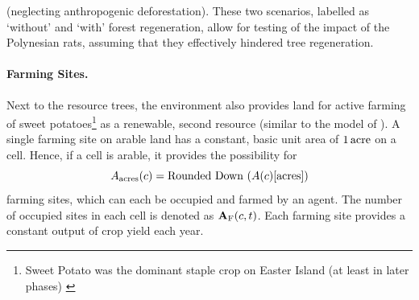 (neglecting anthropogenic deforestation).
These two scenarios, labelled as `without' and `with' forest regeneration, allow for testing of the impact of the Polynesian rats, assuming that they effectively hindered tree regeneration.

\paragraph{Farming Sites.}
Next to the resource trees, the environment also provides land for active farming of sweet potatoes\footnote{Sweet Potato was the dominant staple crop on Easter Island (at least in later phases) \citep{Louwagie2006}} as a renewable, second resource (similar to the model of ).
A single farming site on arable land has a constant, basic unit area of $1\, {\rm acre}$ on a cell. 
Hence, if a cell is arable, it provides the possibility for 
\begin{equation}
A_{\rm acres}(c) = \text{Rounded Down }(A(c)[\text{acres}])
\end{equation}
farming sites, which can each be occupied and farmed by an agent.
The number of occupied sites in each cell is denoted as $\mathbf{A}_{\rm F} (c, t)$.
Each farming site provides a constant output of crop yield each year. 


